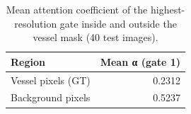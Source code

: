 \begin{table}
\caption{Mean attention coefficient of the highest-resolution gate inside and outside the vessel mask (40 test images).}
\label{tab:attention_inside_outside}
\begin{tabular}{lr}
\toprule
Region & Mean α (gate 1) \\
\midrule
Vessel pixels (GT) & 0.2312 \\
Background pixels & 0.5237 \\
\bottomrule
\end{tabular}
\end{table}
